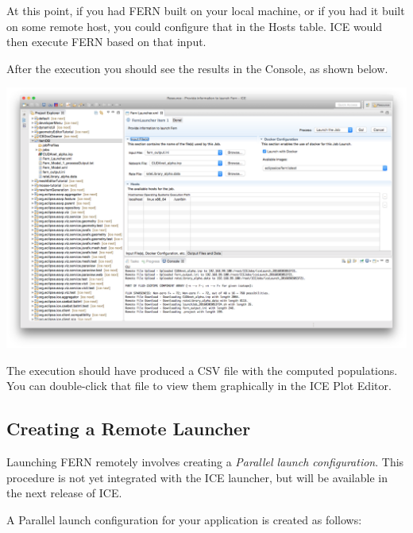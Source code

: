 At this point, if you had FERN built on your local machine, or if you had it
built on some remote host, you could configure that in the Hosts table. ICE
would then execute FERN based on that input. 

After the execution you should see the results in the Console, as shown below.
\begin{center} \includegraphics[width=\textwidth]{figures/launcherResult}
\end{center}
The execution should have produced a CSV file with the computed populations. You
can double-click that file to view them graphically in the ICE Plot Editor. 

\subsection{Creating a Remote Launcher}

Launching FERN remotely involves creating a \textit{Parallel launch
configuration}.
This procedure is not yet integrated with the ICE launcher, but will be
available in the next release of ICE.

A Parallel launch configuration for your application is created as follows:

